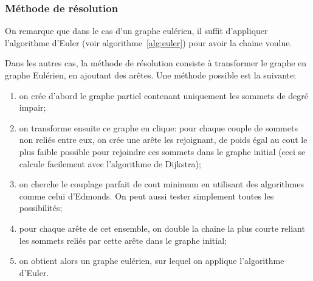   \subsubsection{Méthode de résolution}
    On remarque que dans le cas d'un graphe eulérien, il suffit d'appliquer
    l'algorithme d'Euler (voir algorithme~\ref{alg:euler}) pour avoir la
    chaine voulue.

    Dans les autres cas, la méthode de résolution consiste à transformer le
    graphe en graphe Eulérien, en ajoutant des arêtes. Une méthode possible
    est la suivante:

    \begin{enumerate}
      \item on crée d'abord le graphe partiel contenant uniquement les sommets
        de degré impair;
      \item on transforme ensuite ce graphe en clique: pour chaque couple de
        sommets non reliés entre eux, on crée une arête les rejoignant,
        de poids égal au cout le plus faible possible pour rejoindre ces
        sommets dans le graphe initial (ceci se calcule facilement avec
        l'algorithme de Dijkstra);
      \item on cherche le couplage parfait de cout minimum en utilisant des
        algorithmes comme celui d'Edmonds. On peut aussi tester simplement
        toutes les possibilités;
      \item pour chaque arête de cet ensemble, on double la chaine la plus
        courte reliant les sommets reliés par cette arête dans le graphe initial;
      \item on obtient alors un graphe eulérien, sur lequel on applique
        l'algorithme d'Euler.
    \end{enumerate}

